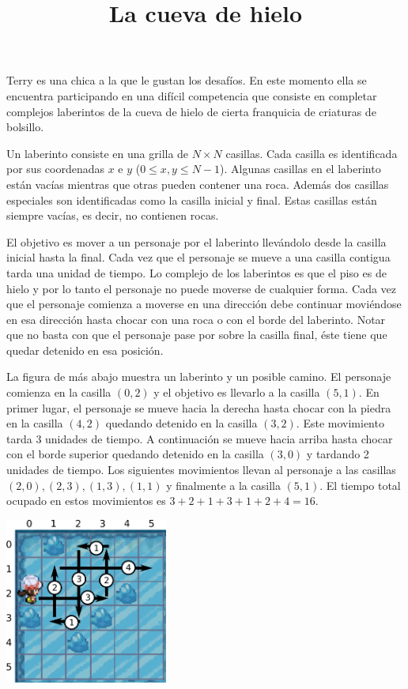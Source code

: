 \documentclass{oci}
\title{La cueva de hielo}
\begin{document}
\maketitle
  Terry es una chica a la que le gustan los desafíos.
En este momento ella se encuentra participando en una difícil competencia que consiste en completar complejos laberintos de la cueva de hielo de cierta franquicia de criaturas de bolsillo.

Un laberinto consiste en una grilla de $N\times N$ casillas.
Cada casilla es identificada por sus coordenadas $x$ e $y$ ($0\leq x,y \leq N-1$).
Algunas casillas en el laberinto están vacías mientras que otras pueden contener una roca.
Además dos casillas especiales son identificadas como la casilla inicial y final.
Estas casillas están siempre vacías, es decir, no contienen rocas.


El objetivo es mover a un personaje por el laberinto llevándolo desde la casilla inicial hasta la final.
Cada vez que el personaje se mueve a una casilla contigua tarda una unidad de tiempo.
Lo complejo de los laberintos es que el piso es de hielo y por lo tanto el personaje no puede moverse de cualquier forma.
Cada vez que el personaje comienza a moverse en una dirección debe continuar moviéndose en esa dirección hasta chocar con una roca o con el borde del laberinto.
Notar que no basta con que el personaje pase por sobre la casilla final, éste tiene que quedar detenido en esa posición.

La figura de más abajo muestra un laberinto y un posible camino.
El personaje comienza en la casilla $(0, 2)$ y el objetivo es llevarlo a la casilla $(5,1)$.
En primer lugar, el personaje se mueve hacia la derecha hasta chocar con la piedra en la casilla $(4,2)$ quedando detenido en la casilla $(3,2)$.
Este movimiento tarda 3 unidades de tiempo.
A continuación se mueve hacia arriba hasta chocar con el borde superior quedando detenido en la casilla $(3,0)$ y tardando 2 unidades de tiempo.
Los siguientes movimientos llevan al personaje a las casillas $(2,0), (2,3), (1,3), (1,1)$ y finalmente a la casilla $(5,1)$.
El tiempo total ocupado en estos movimientos es $3+2+1+3+1+2+4=16$.

\begin{center}
	\includegraphics[width=0.4\textwidth]{Icepath2-arrows.png}
\end{center}
\end{document}
